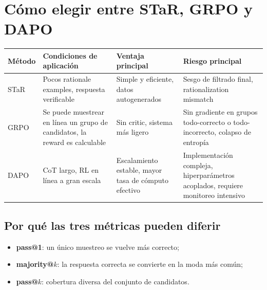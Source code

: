 \section{Cómo elegir entre STaR, GRPO y DAPO}


\begin{table}[H]
\centering
\small
\begin{tabular}{>{\raggedright\arraybackslash}p{2.2cm}>{\raggedright\arraybackslash}p{3.6cm}>{\raggedright\arraybackslash}p{3.6cm}>{\raggedright\arraybackslash}p{4.0cm}}
\toprule
\textbf{Método} & \textbf{Condiciones de aplicación} & \textbf{Ventaja principal} & \textbf{Riesgo principal} \\
\midrule
STaR & Pocos rationale examples, respuesta verificable & Simple y eficiente, datos autogenerados & Sesgo de filtrado final, rationalization mismatch \\
GRPO & Se puede muestrear en línea un grupo de candidatos, la reward es calculable & Sin critic, sistema más ligero & Sin gradiente en grupos todo-correcto o todo-incorrecto, colapso de entropía \\
DAPO & CoT largo, RL en línea a gran escala & Escalamiento estable, mayor tasa de cómputo efectivo & Implementación compleja, hiperparámetros acoplados, requiere monitoreo intensivo \\
\bottomrule
\end{tabular}
\end{table}

\subsection{Por qué las tres métricas pueden diferir}


\begin{itemize}
    \item \textbf{pass@1}: un único muestreo se vuelve más correcto;
    \item \textbf{majority@$k$}: la respuesta correcta se convierte en la moda más común;
    \item \textbf{pass@$k$}: cobertura diversa del conjunto de candidatos.
\end{itemize}

